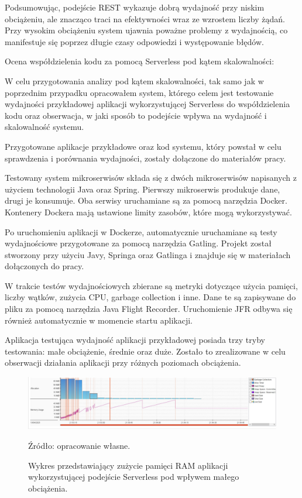 \documentclass[runningheads,12pt]{llncs}
\begin{document}
Podsumowując, podejście REST wykazuje dobrą wydajność przy niskim obciążeniu, ale znacząco traci na efektywności wraz ze wzrostem liczby żądań. Przy wysokim obciążeniu system ujawnia poważne problemy z wydajnością, co manifestuje się poprzez długie czasy odpowiedzi i występowanie błędów.

\newpage



Ocena współdzielenia kodu za pomocą Serverless pod kątem skalowalności:

W celu przygotowania analizy pod kątem skalowalności, tak samo jak w poprzednim przypadku opracowałem system, którego celem jest testowanie wydajności przykładowej aplikacji wykorzystującej Serverless do współdzielenia kodu oraz obserwacja, w jaki sposób to podejście wpływa na wydajność i skalowalność systemu.

Przygotowane aplikacje przykładowe oraz kod systemu, który powstał w celu sprawdzenia i porównania wydajności, zostały dołączone do materiałów pracy.

Testowany system mikroserwisów składa się z dwóch mikroserwisów napisanych z użyciem technologii Java oraz Spring. Pierwszy mikroserwis produkuje dane, drugi je konsumuje. Oba serwisy uruchamiane są za pomocą narzędzia Docker. Kontenery Dockera mają ustawione limity zasobów, które mogą wykorzystywać.

Po uruchomieniu aplikacji w Dockerze, automatycznie uruchamiane są testy wydajnościowe przygotowane za pomocą narzędzia Gatling. Projekt został stworzony przy użyciu Javy, Springa oraz Gatlinga i znajduje się w materiałach dołączonych do pracy.

W trakcie testów wydajnościowych zbierane są metryki dotyczące użycia pamięci, liczby wątków, zużycia CPU, garbage collection i inne. Dane te są zapisywane do pliku za pomocą narzędzia Java Flight Recorder. Uruchomienie JFR odbywa się również automatycznie w momencie startu aplikacji.

Aplikacja testująca wydajność aplikacji przykładowej posiada trzy tryby testowania: małe obciążenie, średnie oraz duże. Zostało to zrealizowane w celu obserwacji działania aplikacji przy różnych poziomach obciążenia.

\newpage

\begin{figure}
    \includegraphics[width=\linewidth]{images/serverless-memory-low-graph.jpg}
    \caption{Wykres przedstawiający zużycie pamięci RAM aplikacji wykorzystującej podejście Serverless pod wpływem małego obciążenia.} \label{fig1}
    \vspace{0.5em}
    {\small Źródło: opracowanie własne.}
\end{figure}
\end{document}
